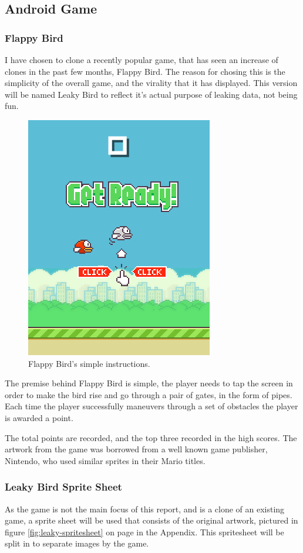 \clearpage
\subsection{Android Game}
\subsubsection{Flappy Bird}
\label{design:flappy-bird}
I have chosen to clone a recently popular game, that has seen an increase of clones in the past few months, Flappy Bird. The reason for chosing this is the simplicity of the overall game, and the virality that it has displayed. This version will be named Leaky Bird to reflect it's actual purpose of leaking data, not being fun. 

\begin{figure}[h!]
\centering\includegraphics{design/figures/flappy-b-1.png}
\caption{Flappy Bird's simple instructions.}
\label{fig:android_fb1}
\end{figure}

The premise behind Flappy Bird is simple, the player needs to tap the screen in order to make the bird rise and go through a pair of gates, in the form of pipes. Each time the player successfully maneuvers through a set of obstacles the player is awarded a point.

The total points are recorded, and the top three recorded in the high scores. The artwork from the game was borrowed from a well known game publisher, Nintendo, who used similar sprites in their Mario titles.

\subsubsection{Leaky Bird Sprite Sheet}
As the game is not the main focus of this report, and is a clone of an existing game, a sprite sheet will be used that consists of the original artwork, pictured in figure \ref{fig:leaky-spritesheet} on page \pageref{fig:leaky-spritesheet} in the Appendix. This spritesheet will be split in to separate images by the game.

